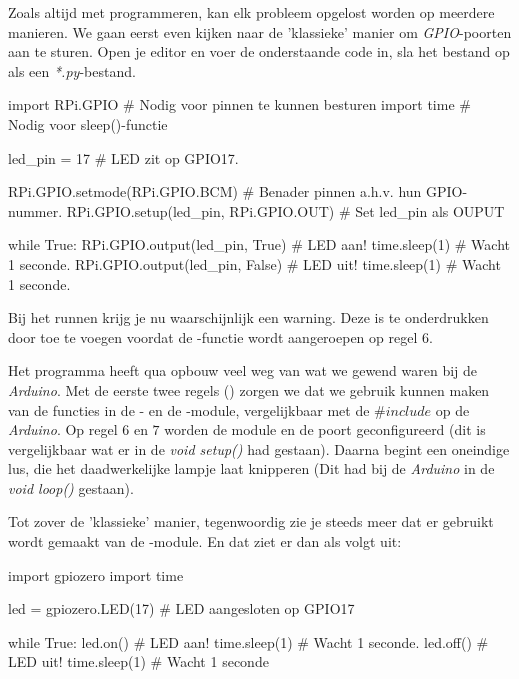 Zoals altijd met programmeren, kan elk probleem opgelost worden op meerdere manieren. We gaan eerst even kijken naar de 'klassieke' manier om \textit{GPIO}-poorten aan te sturen. Open je editor en voer de onderstaande code in, sla het bestand op als een \textit{*.py}-bestand.

\begin{python}
import RPi.GPIO  # Nodig voor pinnen te kunnen besturen
import time      # Nodig voor sleep()-functie

led_pin = 17     # LED zit op GPIO17.

RPi.GPIO.setmode(RPi.GPIO.BCM)         # Benader pinnen a.h.v. hun GPIO-nummer.
RPi.GPIO.setup(led_pin, RPi.GPIO.OUT)  # Set led_pin als OUPUT

while True:
    RPi.GPIO.output(led_pin, True)   # LED aan!
    time.sleep(1)                    # Wacht 1 seconde.
    RPi.GPIO.output(led_pin, False)  # LED uit!
    time.sleep(1)                    # Wacht 1 seconde.
\end{python}

\begin{remark}
Bij het runnen krijg je nu waarschijnlijk een warning. Deze is te onderdrukken door  toe te voegen voordat de -functie wordt aangeroepen op regel $6$.
\end{remark}

Het programma heeft qua opbouw veel weg van wat we gewend waren bij de \textit{Arduino}. Met de eerste twee regels () zorgen we dat we gebruik kunnen maken van de functies in de - en de -module, vergelijkbaar met de $\#include$ op de \textit{Arduino}. Op regel $6$ en $7$ worden de module en de poort geconfigureerd (dit is vergelijkbaar wat er in de \textit{void setup()} had gestaan). Daarna begint een oneindige lus, die het daadwerkelijke lampje laat knipperen (Dit had bij de \textit{Arduino} in de \textit{void loop()} gestaan). 

Tot zover de 'klassieke' manier, tegenwoordig zie je steeds meer dat er gebruikt wordt gemaakt van de -module. En dat ziet er dan als volgt uit:
\begin{python}
import gpiozero
import time

led = gpiozero.LED(17)  # LED aangesloten op GPIO17
 
while True: 
    led.on()       # LED aan!
    time.sleep(1)  # Wacht 1 seconde.
    led.off()      # LED uit!
    time.sleep(1)  # Wacht 1 seconde
\end{python}

